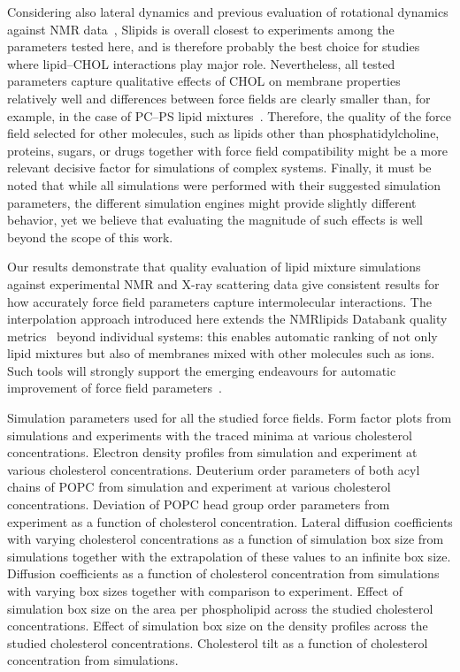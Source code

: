 \documentclass[journal=jctcce]{achemso}
\begin{document}
Considering also lateral dynamics and previous evaluation of rotational dynamics against NMR data~\cite{antila21using}, Slipids is overall closest to experiments among the parameters tested here, and is therefore probably the best choice for studies where lipid--CHOL interactions play major role. Nevertheless, all tested parameters capture qualitative effects of CHOL on membrane properties relatively well and differences between force fields are clearly smaller than, for example, in the case of PC--PS lipid mixtures~\cite{antila2022emerging}. Therefore, the quality of the force field selected for other molecules, such as lipids other than phosphatidylcholine, proteins, sugars, or drugs together with force field compatibility might be a more relevant decisive factor for simulations of complex systems. Finally, it must be noted that while all simulations were performed with their suggested simulation parameters, the different simulation engines might provide slightly different behavior, yet we believe that evaluating the magnitude of such effects is well beyond the scope of this work.

Our results demonstrate that quality evaluation of lipid mixture simulations against experimental NMR and X-ray scattering data give consistent results for how accurately force field parameters capture intermolecular interactions. The interpolation approach introduced here extends the NMRlipids Databank quality metrics~\cite{NMRlipidsDatabank} beyond individual systems: this enables automatic ranking of not only lipid mixtures but also of membranes mixed with other molecules such as ions. Such tools will strongly support the emerging endeavours for automatic improvement of force field parameters~\cite{antila2022emerging}.

\begin{suppinfo}
Simulation parameters used for all the studied force fields.
%
Form factor plots from simulations and experiments with the traced minima at various cholesterol concentrations.
%
Electron density profiles from simulation and experiment at various cholesterol concentrations.
%
Deuterium order parameters of both acyl chains of POPC from simulation and experiment at various cholesterol concentrations.
%
Deviation of POPC head group order parameters from experiment as a function of cholesterol concentration.
%
Lateral diffusion coefficients with varying cholesterol concentrations as a function of simulation box size from simulations together with the extrapolation of these values to an infinite box size.
%
Diffusion coefficients as a function of cholesterol concentration from simulations with varying box sizes together with comparison to experiment.
%
Effect of simulation box size on the area per phospholipid across the studied cholesterol concentrations.
%
Effect of simulation box size on the density profiles across the studied cholesterol concentrations.
%
Cholesterol tilt as a function of cholesterol concentration from simulations.
\end{suppinfo}
\end{document}
